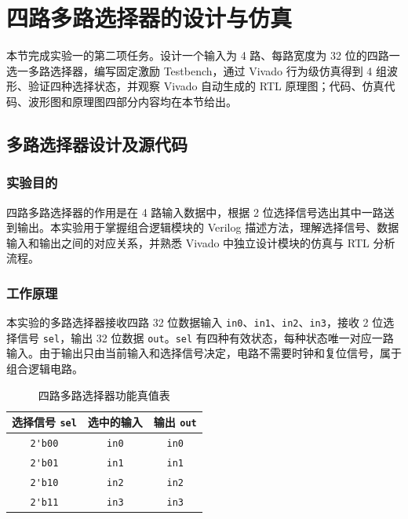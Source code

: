\section{四路多路选择器的设计与仿真}

本节完成实验一的第二项任务。设计一个输入为 4 路、每路宽度为 32 位的四路一选一多路选择器，编写固定激励 Testbench，通过 Vivado 行为级仿真得到 4 组波形、验证四种选择状态，并观察 Vivado 自动生成的 RTL 原理图；代码、仿真代码、波形图和原理图四部分内容均在本节给出。

\subsection{多路选择器设计及源代码}

\subsubsection{实验目的}

四路多路选择器的作用是在 4 路输入数据中，根据 2 位选择信号选出其中一路送到输出。本实验用于掌握组合逻辑模块的 Verilog 描述方法，理解选择信号、数据输入和输出之间的对应关系，并熟悉 Vivado 中独立设计模块的仿真与 RTL 分析流程。

\subsubsection{工作原理}

本实验的多路选择器接收四路 32 位数据输入 \verb|in0|、\verb|in1|、\verb|in2|、\verb|in3|，接收 2 位选择信号 \verb|sel|，输出 32 位数据 \verb|out|。\verb|sel| 有四种有效状态，每种状态唯一对应一路输入。由于输出只由当前输入和选择信号决定，电路不需要时钟和复位信号，属于组合逻辑电路。

\begin{table}[H]
    \centering
    \caption{四路多路选择器功能真值表}
    \label{tab:mux4_truth}
    \begin{tabular}{c|c|c}
        \hline
        选择信号 \verb|sel| & 选中的输入 & 输出 \verb|out| \\
        \hline
        \verb|2'b00| & \verb|in0| & \verb|in0| \\
        \verb|2'b01| & \verb|in1| & \verb|in1| \\
        \verb|2'b10| & \verb|in2| & \verb|in2| \\
        \verb|2'b11| & \verb|in3| & \verb|in3| \\
        \hline
    \end{tabular}
\end{table}

